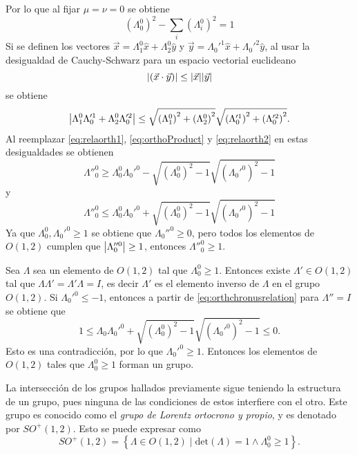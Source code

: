 Por lo que al fijar $\mu=\nu=0$ se obtiene
\begin{equation}
	(\Lambda_0^0)^2 - \sum_i(\Lambda_i^0)^2 = 1\label{eq:relaorth2}
\end{equation}
Si se definen los vectores $\vec{x} = \Lambda_1^0 \hat{x} + \Lambda_2^0 \hat{y}$ y $\vec{y} = \Lambda_0'^1 \hat{x} + \Lambda_0'^2 \hat{y}$, al usar la desigualdad de Cauchy-Schwarz para un espacio vectorial euclideano
\begin{equation}
	\abs{\left(\vec{x}\cdot \vec{y}\right)} \leq \abs{\vec{x}}\abs{\vec{y}}
\end{equation}
se obtiene
\begin{equation}
	\abs{\Lambda_1^0 \Lambda_0'^1 + \Lambda_2^0 \Lambda_0'^2} \leq \sqrt{\left(\Lambda_1^0\right)^2 + \left(\Lambda_2^0\right)^2} \sqrt{\left(\Lambda_0'^1\right)^2 + \left(\Lambda_0'^2\right)^2}.
\end{equation}
Al reemplazar \eqref{eq:relaorth1}, \eqref{eq:orthoProduct} y \eqref{eq:relaorth2}  en estas desigualdades se obtienen
\begin{equation}
	\Lambda''^0_0 \geq \Lambda_0^0\Lambda_0'^0 - \sqrt{\left(\Lambda_0^0\right)^2 -1} \sqrt{\left(\Lambda_0'^0\right)^2 -1}
\end{equation}
y
\begin{equation}
	\Lambda''^0_0 \leq \Lambda_0^0\Lambda_0'^0 + \sqrt{\left(\Lambda_0^0\right)^2 -1} \sqrt{\left(\Lambda_0'^0\right)^2 -1}\label{eq:orthchronusrelation}
\end{equation}
Ya que $\Lambda_0^0,\Lambda_0'^0 \geq 1$ se obtiene que $\Lambda_0''^0 \geq 0$, pero todos los elementos de $O(1,2)$ cumplen que $\abs{\Lambda_0''^0} \geq 1$, entonces $\Lambda''^0_0 \geq 1$.

Sea $\Lambda$ sea un elemento de $O(1,2)$ tal que $\Lambda_0^0 \geq 1$. Entonces existe $\Lambda' \in O(1,2)$ tal que  $\Lambda\Lambda' = \Lambda'\Lambda= I$, es decir $\Lambda'$ es el elemento inverso de $\Lambda$ en el grupo $O(1,2)$. Si $\Lambda_0'^0\leq -1$, entonces a partir de \eqref{eq:orthchronusrelation} para $\Lambda'' = I$ se obtiene que
\begin{equation}
	1 \leq \Lambda_0\Lambda_0'^0 + \sqrt{\left(\Lambda_0^0\right)^2 -1} \sqrt{\left(\Lambda_0'^0\right)^2 -1}\leq 0.
\end{equation}
Esto es una contradicción, por lo que $\Lambda_0'^0 \geq 1$. Entonces los elementos de $O(1,2)$ tales que $\Lambda_0^0 \geq 1$ forman un grupo.

La intersección de los grupos hallados previamente sigue teniendo la estructura de un grupo, pues ninguna de las condiciones de estos interfiere con el otro. Este grupo es conocido como el \emph{grupo de Lorentz ortocrono y propio}, y es denotado por $SO^+(1,2)$. Esto se puede expresar como
\begin{equation}
	SO^+(1,2) = \left\{\Lambda \in O(1,2) \mid \text{det}(\Lambda) = 1 \wedge\Lambda_0^0\geq 1\right\}.
\end{equation}

